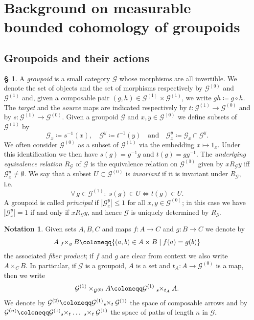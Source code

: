 \documentclass[11pt, oneside]{amsart}
\theoremstyle{definition}
\newtheorem{notation}[lemma]{Notation}
\newtheorem{no}[lemma]{\S}
\theoremstyle{remark}
\theoremstyle{TheoremNum}
\newcommand{\cG}{\mathcal{G}}
\newcommand{\qand}{\quad \text{and} \quad}
\begin{document}
\section{Background on measurable bounded cohomology of groupoids}\label{SecGroupoids}

\subsection{Groupoids and their actions}\label{sec2.1}

\begin{no}\label{BasicGroupoid}  A \emph{groupoid} is a small category $\mathcal{G}$ whose morphisms are all invertible. We denote the set of objects and the set of morphisms respectively by $\mathcal{G}^{(0)}$ and $\mathcal{G}^{(1)}$ and, given a composable pair $(g,h) \in \cG^{(1)}\times \mathcal{G}^{(1)}$, we write $gh \coloneqq  g \circ h$. The \emph{target} and the \emph{source} maps are indicated respectively by $t:\mathcal{G}^{(1)}\to \mathcal{G}^{(0)}$ and by $s:\mathcal{G}^{(1)}\to \mathcal{G}^{(0)}$. Given a groupoid $\cG$ and $x,y \in \cG^{(0)}$ we define subsets of $\cG^{(1)}$ by
\[\cG_x \coloneqq  s^{-1}(x), \quad \cG^y \coloneqq  t^{-1}(y) \qand \cG_x^y \coloneqq  \cG_x \cap \cG^y.\] 
We often consider $\cG^{(0)}$ as a subset of $\cG^{(1)}$ via the embedding $x \mapsto 1_x$. Under this identification we then have $s(g) = g^{-1}g$ and $t(g) = gg^{-1}$.
The \emph{underlying equivalence relation} $R_{\cG}$ of $\cG$ is the equivalence relation on $\cG^{(0)}$ given by $xR_{\cG} y$ iff $\cG_x^y \neq \emptyset$. We say that a subset $U\subset \mathcal{G}^{(0)}$ is \emph{invariant} if it is invariant under $R_{\cG}$, i.e.\ \[
\forall\, g \in \cG^{(1)}: \; s(g) \in U \iff t(g) \in U.
\]
A groupoid is called \emph{principal} if $|\cG_x^y| \leq 1$ for all $x,y \in \cG^{(0)}$; in this case we have  $|\cG_x^y| = 1$ if and only if $x R_{\cG} y$, and hence $\cG$ is uniquely determined by $R_{\cG}$. 
\end{no}
 \begin{notation} Given sets $A, B, C$ and maps $f: A \to C$ and $g: B \to C$ we denote by
\[
A \; {}_f\negthickspace \times_g B \coloneqq  \{(a,b) \in A \times B \mid f(a) = g(b)\}
\]
the associated \emph{fiber product}; if $f$ and $g$ are clear from context we also write $A \times_C B$. In particular, if $\cG$ is a groupoid, $A$ is a set and $t_A: A \to \cG^{(0)}$ is a map, then we write
\[
 \mathcal{G}^{(1)} \times_{\mathcal{G}^{(0)}}A \coloneqq  \mathcal{G}^{(1)}\; {}_s \negthickspace \times_{t_A} A.
\]
We denote by $\cG^{(2)} \coloneqq \cG^{(1)} {}_s \negthickspace \times _t \cG^{(1)}$ the space of composable arrows and by $\cG^{(n)} \coloneqq \cG^{(1)}  {}_s \negthickspace \times _t \dots \ {}_s \negthickspace \times_t \cG^{(1)}$ the space of paths of length $n$ in $\cG$.
\end{notation}
\end{document}
